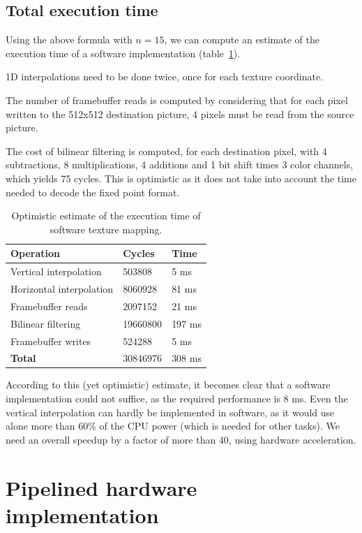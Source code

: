 \documentclass[a4paper,11pt]{kthesis}
\begin{document}
\subsection{Total execution time}
Using the above formula with $n=15$, we can compute an estimate of the execution time of a software implementation (table~\ref{tab:swtmutime}).

1D interpolations need to be done twice, once for each texture coordinate.

The number of framebuffer reads is computed by considering that for each pixel written to the 512x512 destination picture, 4 pixels must be read from the source picture.

The cost of bilinear filtering is computed, for each destination pixel, with 4 subtractions, 8 multiplications, 4 additions and 1 bit shift times 3 color channels, which yields 75 cycles. This is optimistic as it does not take into account the time needed to decode the fixed point format.

\begin{table}
\centering
\begin{tabular}{|l|l|l|}
\hline
\textbf{Operation} & \textbf{Cycles} & \textbf{Time} \\
\hline
Vertical interpolation & 503808 & 5 ms \\
\hline
Horizontal interpolation & 8060928 & 81 ms \\
\hline
Framebuffer reads & 2097152 & 21 ms \\
\hline
Bilinear filtering & 19660800 & 197 ms \\
\hline
Framebuffer writes & 524288 & 5 ms \\
\hline
\textbf{Total} & 30846976 & 308 ms \\
\hline
\end{tabular}
\caption{Optimistic estimate of the execution time of software texture mapping.}\label{tab:swtmutime}
\end{table}

According to this (yet optimistic) estimate, it becomes clear that a software implementation could not suffice, as the required performance is 8 ms. Even the vertical interpolation can hardly be implemented in software, as it would use alone more than 60\% of the CPU power (which is needed for other tasks). We need an overall speedup by a factor of more than 40, using hardware acceleration.

\section{Pipelined hardware implementation}
\end{document}

